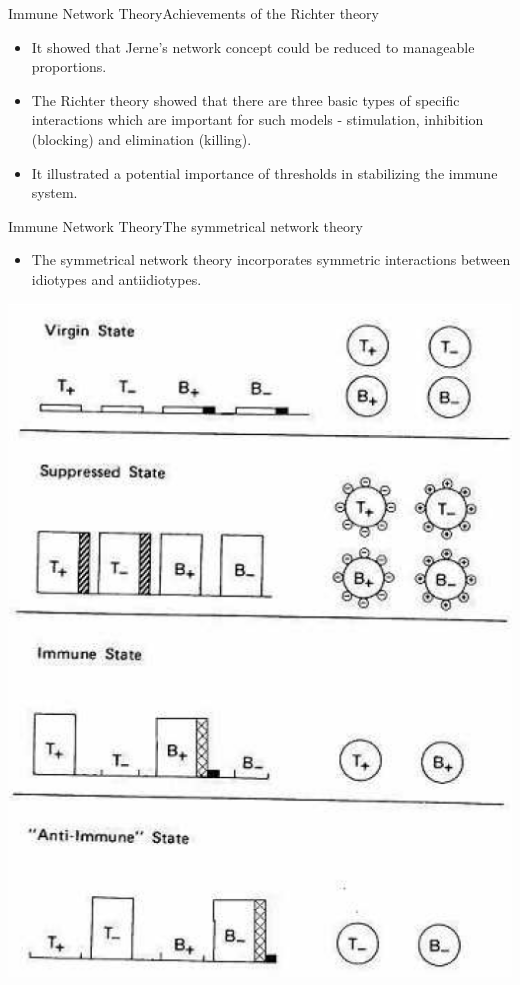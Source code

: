 \begin{frame}{Immune Network Theory}{Achievements of the Richter theory}
  \begin{itemize}
  \item \large{
    It showed that Jerne's network concept could be reduced to manageable proportions.
  }
  \item \large{
    The Richter theory showed that there are three basic types of specific interactions which are important for such models - stimulation, inhibition (blocking) and elimination (killing).
  }
  \item \large{
    It illustrated a potential importance of thresholds in stabilizing the immune system.
  }
  \end{itemize}
\end{frame}

\begin{frame}{Immune Network Theory}{The symmetrical network theory}
  \begin{itemize}
  \item \large
    The symmetrical network theory incorporates symmetric interactions between idiotypes and antiidiotypes.
  \end{itemize}
  \par
  \centering
    \includegraphics[scale=0.40] {img/symmetrical_network_theory.png}
  \par
\end{frame}

